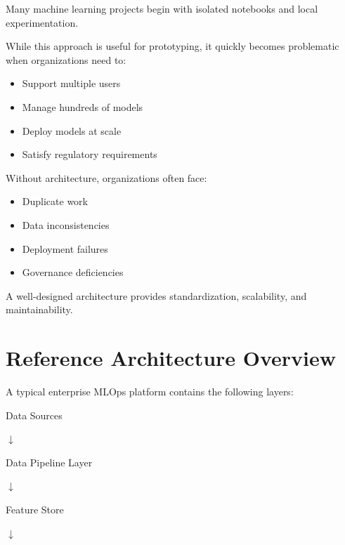 Many machine learning projects begin with isolated notebooks and local experimentation.

While this approach is useful for prototyping, it quickly becomes problematic when organizations need to:

\begin{itemize}
    \item Support multiple users
    \item Manage hundreds of models
    \item Deploy models at scale
    \item Satisfy regulatory requirements
\end{itemize}

Without architecture, organizations often face:

\begin{itemize}
    \item Duplicate work
    \item Data inconsistencies
    \item Deployment failures
    \item Governance deficiencies
\end{itemize}

A well-designed architecture provides standardization, scalability, and maintainability.

\section{Reference Architecture Overview}

A typical enterprise MLOps platform contains the following layers:

\begin{center}
Data Sources
\end{center}

\begin{center}
$\downarrow$
\end{center}

\begin{center}
Data Pipeline Layer
\end{center}

\begin{center}
$\downarrow$
\end{center}

\begin{center}
Feature Store
\end{center}

\begin{center}
$\downarrow$
\end{center}

